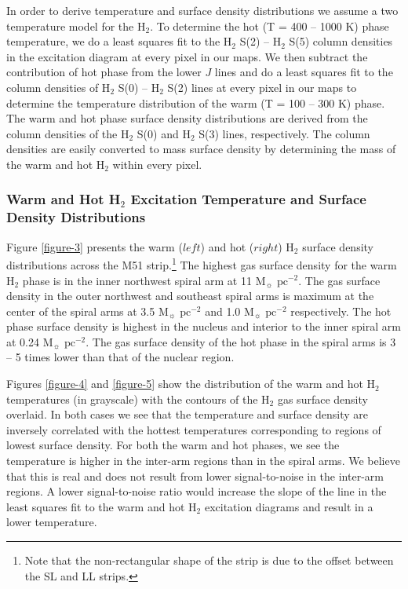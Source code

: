 \documentclass[manuscript]{aastex}
\begin{document}
In order to derive temperature and surface density 
distributions we assume a two temperature model for the 
H$_2$.  To determine the hot (T = 400 -- 1000 K) 
phase temperature, we do a least squares fit 
to the H$_2$ S(2) -- H$_2$ S(5) column densities in the 
excitation diagram at every pixel in our maps.  
We then subtract the contribution of hot phase from the lower $J$ 
lines and do a least squares fit to the column densities of 
H$_2$ S(0) -- H$_2$ S(2) lines at every pixel in our 
maps to determine the temperature distribution 
of the warm (T = 100 -- 300 K) phase.  The warm and hot 
phase surface density distributions are derived from the 
column densities of the H$_2$ S(0) and H$_2$ S(3) lines, 
respectively.  The column densities are easily converted 
to mass surface density by determining the mass of the 
warm and hot H$_2$ within every pixel. 

\subsubsection{Warm and Hot H$_2$ Excitation Temperature and Surface Density Distributions}

Figure \ref{figure-3} presents the warm ($left$) and hot ($right$)
$\mathrm{H_2}$ surface density distributions across the M51 strip.\footnote{Note
  that the non-rectangular shape of the strip is due to the offset
  between the SL and LL strips.}  The highest gas surface 
  density for the warm $\mathrm{H_2}$ phase is in the 
  inner northwest spiral arm at 11 $\mathrm{M_\sun}$ 
  $\mathrm{pc^{-2}}$. The gas 
  surface density in the outer northwest and southeast 
  spiral arms is maximum at the center of the spiral arms 
  at 3.5 $\mathrm{M_\sun}$ $\mathrm{pc^{-2}}$ and 1.0 
  $\mathrm{M_\sun}$ $\mathrm{pc^{-2}}$ respectively.  
  The hot phase surface density is highest in the 
  nucleus and interior to the inner spiral arm at 0.24 
  $\mathrm{M_\sun}$ $\mathrm{pc^{-2}}$.  The gas surface 
  density of the hot phase in the spiral arms is 3 -- 5 times 
  lower than that of the nuclear region.

Figures \ref{figure-4} and \ref{figure-5} show the distribution 
of the warm and hot H$_2$ temperatures (in grayscale) with 
the contours of the H$_2$ gas surface density overlaid.  In 
both cases we see that the temperature and surface density 
are inversely correlated with the hottest temperatures 
corresponding to regions of lowest surface density.  For 
both the warm and hot phases, we see the temperature 
is higher in the inter-arm regions than in the spiral arms.  We believe that this 
is real and does not result from lower signal-to-noise 
in the inter-arm regions.  A lower signal-to-noise 
ratio would increase the slope of the line in the least 
squares fit to the warm and hot H$_2$ excitation 
diagrams and result in a lower temperature.
\end{document}
